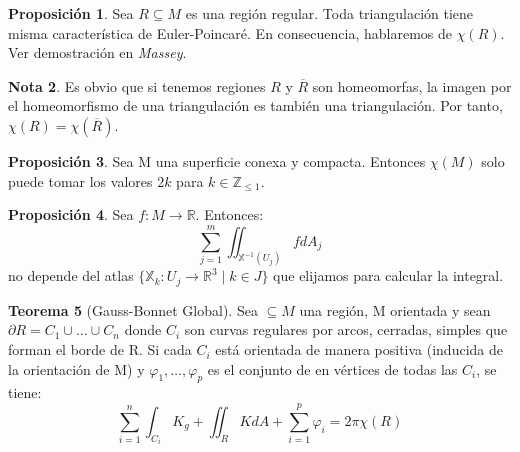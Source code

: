 \documentclass[twoside]{report}
\theoremstyle{definition}
\newtheorem{theorem}{Teorema}[section]
\newtheorem{nota}[theorem]{Nota}
\newtheorem{prop}[theorem]{Proposición}
\numberwithin{equation}{section}
\newcommand{\Z}{\mathbb{Z}}
\newcommand{\R}{\mathbb{R}}
\newcommand{\X}{\mathbb{X}}
\begin{document}
\begin{prop} Sea $R \subseteq M$ es una región regular. Toda triangulación tiene misma característica de Euler-Poincaré. En consecuencia, hablaremos de $χ(R)$. Ver demostración en \textit{Massey}.
\end{prop}
\begin{nota} Es obvio que si tenemos regiones $R$ y $\overline{R}$ son homeomorfas, la imagen por el homeomorfismo de una triangulación es también una triangulación. Por tanto, $\chi(R) = \chi(\overline{R})$.
\end{nota}
\begin{prop} Sea M una superficie conexa y compacta. Entonces $\chi(M)$ solo puede tomar los valores $2k$ para $k\in\Z_{\leq 1}$.
\end{prop}
\begin{prop} Sea $f:M\rightarrow \R$. Entonces:
\[
\sum_{j=1}^m \iint_{\X^{-1}(U_j)} f dA_j
\]
no depende del atlas $\{\X_k : U_j \rightarrow \R^3\mid k\in J\}$ que elijamos para calcular la integral.
\end{prop}
\begin{theorem}[Gauss-Bonnet Global] Sea $\subseteq M$ una región, M orientada y sean $\partial R= C_1\cup \dotsc \cup C_n$ donde $C_i$ son curvas regulares por arcos, cerradas, simples que forman el borde de R. Si cada $C_i$ está orientada de manera positiva (inducida de la orientación de M) y $\varphi_1,\dotsc,\varphi_p$ es el conjunto de en vértices de todas las $C_i$, se tiene:
\[
\sum_{i=1}^n \int_{C_i}K_g + \iint_R KdA + \sum_{i=1}^p \varphi_i = 2\pi \chi(R)
\]
\end{theorem}
\end{document}

